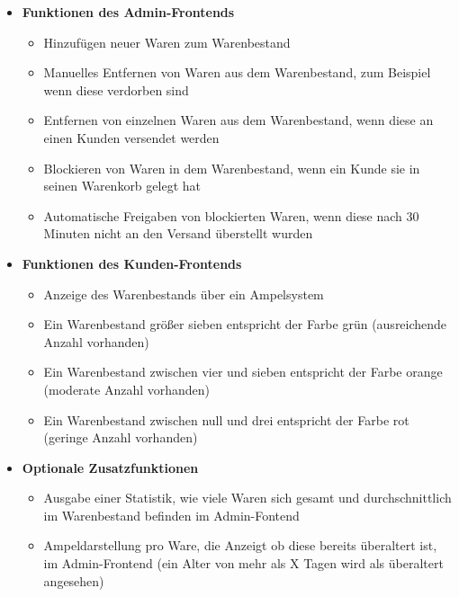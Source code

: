 \begin{itemize}
	\item \textbf{Funktionen des Admin-Frontends}
	\begin{itemize}
		\item Hinzufügen neuer Waren zum Warenbestand
		\item Manuelles Entfernen von Waren aus dem Warenbestand, zum Beispiel wenn diese verdorben sind
		\item Entfernen von einzelnen Waren aus dem Warenbestand, wenn diese an einen Kunden versendet werden
		\item Blockieren von Waren in dem Warenbestand, wenn ein Kunde sie in seinen Warenkorb gelegt hat
		\item Automatische Freigaben von blockierten Waren, wenn diese nach 30 Minuten nicht an den Versand überstellt wurden
	\end{itemize}
	\item \textbf{Funktionen des Kunden-Frontends}
	\begin{itemize}
		\item Anzeige des Warenbestands über ein Ampelsystem 
		\item Ein Warenbestand größer sieben entspricht der Farbe grün (ausreichende Anzahl vorhanden)
		\item Ein Warenbestand zwischen vier und sieben entspricht der Farbe orange (moderate Anzahl vorhanden)		
		\item Ein Warenbestand zwischen null und drei entspricht der Farbe rot (geringe Anzahl vorhanden)
	\end{itemize}
	\item \textbf{Optionale Zusatzfunktionen}
	\begin{itemize}
		\item Ausgabe einer Statistik, wie viele Waren sich gesamt und durchschnittlich im Warenbestand befinden im Admin-Fontend
		\item Ampeldarstellung pro Ware, die Anzeigt ob diese bereits überaltert ist, im Admin-Frontend (ein Alter von mehr als X Tagen wird als überaltert angesehen)
	\end{itemize}
\end{itemize}
